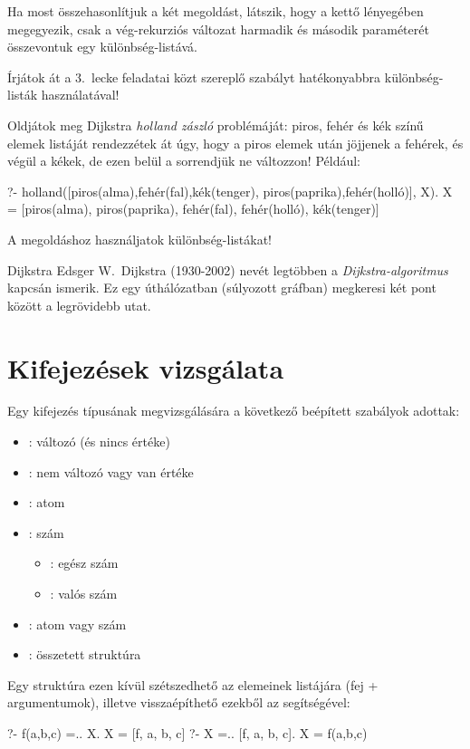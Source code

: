 Ha most összehasonlítjuk a két megoldást, látszik,
hogy a kettő lényegében megegyezik, csak a
vég-rekurziós változat harmadik és második
paraméterét összevontuk egy különbség-listává.

\begin{problem}
Írjátok át a 3.~lecke feladatai közt szereplő
 szabályt hatékonyabbra különbség-listák
használatával!
\end{problem}
\begin{problem}
Oldjátok meg Dijkstra \emph{holland zászló}
problémáját: piros, fehér és kék színű elemek
listáját rendezzétek át úgy, hogy a piros elemek
után jöjjenek a fehérek, és végül a kékek, de ezen
belül a sorrendjük ne változzon! Például:
\begin{query}
?- holland([piros(alma),fehér(fal),kék(tenger),
            piros(paprika),fehér(holló)], X).
X = [piros(alma), piros(paprika), fehér(fal),
     fehér(holló), kék(tenger)]
\end{query}
A megoldáshoz használjatok különbség-listákat!
\end{problem}

\begin{infobox}{}{Dijkstra}
Edsger W.~Dijkstra (1930-2002) nevét legtöbben a
\emph{Dijkstra-algoritmus} kapcsán ismerik. Ez egy
úthálózatban (súlyozott gráfban) megkeresi két pont
között a legrövidebb utat.
\end{infobox}

\section{Kifejezések vizsgálata}
Egy kifejezés típusának megvizsgálására a következő
beépített szabályok adottak:
\begin{itemize}
\item {} :  változó (és nincs értéke)
\item {} :  nem változó vagy van értéke
\item {} :  atom
\item {} :  szám
  \begin{itemize}
    \item {} :  egész szám
    \item {} :  valós szám
  \end{itemize}
\item {} :  atom vagy szám
\item {} :  összetett struktúra
\end{itemize}
Egy struktúra ezen kívül szétszedhető az elemeinek
listájára (fej + argumentumok), illetve
visszaépíthető ezekből az  segítségével:
\begin{query}
?- f(a,b,c) =.. X.
X = [f, a, b, c]
?- X =.. [f, a, b, c].
X = f(a,b,c)
\end{query}


